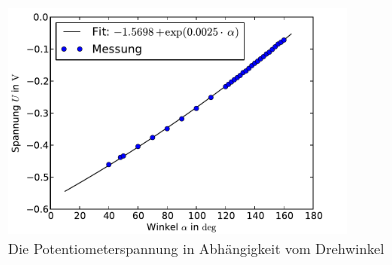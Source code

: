 \documentclass[11pt]{scrartcl}
\begin{document}
\begin{figure}[ht]
\begin{center}
\includegraphics[width=0.8\textwidth]{winkel_spannung.pdf}
\end{center}
\vspace{-1.5\baselineskip}
\caption{Die Potentiometerspannung in Abhängigkeit vom Drehwinkel}
\label{winkel_spannung}
\end{figure}


\FloatBarrier
\end{document}

